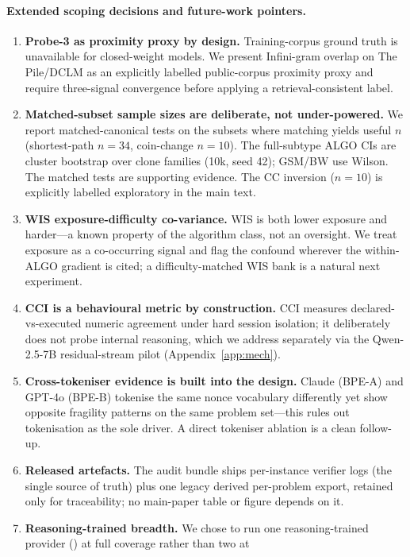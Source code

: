 \paragraph{Extended scoping decisions and future-work pointers.}
\begin{enumerate}
  \item \textbf{Probe-3 as proximity proxy by design.} Training-corpus ground
  truth is unavailable for closed-weight models. We present Infini-gram
  overlap on The Pile/DCLM as an explicitly labelled public-corpus proximity
  proxy and require three-signal convergence before applying a
  retrieval-consistent label.
  \item \textbf{Matched-subset sample sizes are deliberate, not
  under-powered.} We report matched-canonical tests on the subsets where
  matching yields useful $n$ (shortest-path $n{=}34$, coin-change $n{=}10$).
  The full-subtype ALGO CIs are cluster bootstrap over clone families
  (10k, seed 42); GSM/BW use Wilson. The matched tests
  are supporting evidence. The CC inversion ($n{=}10$) is explicitly labelled
  exploratory in the main text.
  \item \textbf{WIS exposure-difficulty co-variance.} WIS is both lower
  exposure and harder---a known property of the algorithm class, not an
  oversight. We treat exposure as a co-occurring signal and flag the confound
  wherever the within-ALGO gradient is cited; a difficulty-matched WIS bank
  is a natural next experiment.
  \item \textbf{CCI is a behavioural metric by construction.} CCI measures
  declared-vs-executed numeric agreement under hard session isolation; it
  deliberately does not probe internal reasoning, which we address separately
  via the Qwen-2.5-7B residual-stream pilot (Appendix~\ref{app:mech}).
  \item \textbf{Cross-tokeniser evidence is built into the design.} Claude
  (BPE-A) and GPT-4o (BPE-B) tokenise the same nonce vocabulary differently
  yet show opposite fragility patterns on the same problem set---this rules
  out tokenisation as the sole driver. A direct tokeniser ablation is a clean
  follow-up.
  \item \textbf{Released artefacts.} The audit bundle ships per-instance
  verifier logs (the single source of truth) plus one legacy derived
  per-problem export, retained only for traceability; no main-paper table or
  figure depends on it.
  \item \textbf{Reasoning-trained breadth.} We chose to run one
  reasoning-trained provider (\omini) at full coverage rather than two at

\end{enumerate}
